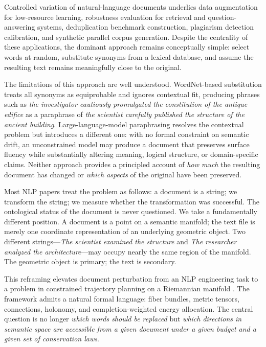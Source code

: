 \documentclass[12pt, a4paper]{article}
\theoremstyle{plain}
\theoremstyle{definition}
\theoremstyle{remark}
\begin{document}
Controlled variation of natural-language documents underlies data augmentation
for low-resource learning, robustness evaluation for retrieval and
question-answering systems, deduplication benchmark construction, plagiarism
detection calibration, and synthetic parallel corpus generation.  Despite the
centrality of these applications, the dominant approach remains conceptually
simple: select words at random, substitute synonyms from a lexical database,
and assume the resulting text remains meaningfully close to the original.

The limitations of this approach are well understood.  WordNet-based substitution
\cite{miller1995wordnet} treats all synonyms as equiprobable and ignores
contextual fit, producing phrases such as \emph{the investigator cautiously
promulgated the constitution of the antique edifice} as a paraphrase of
\emph{the scientist carefully published the structure of the ancient building}.
Large-language-model paraphrasing \cite{brown2020gpt3} resolves the contextual
problem but introduces a different one: with no formal constraint on semantic
drift, an unconstrained model may produce a document that preserves surface
fluency while substantially altering meaning, logical structure, or
domain-specific claims.  Neither approach provides a principled account of
\emph{how much} the resulting document has changed or \emph{which aspects} of
the original have been preserved.

Most NLP papers treat the problem as follows: a document is a string; we
transform the string; we measure whether the transformation was successful.
The ontological status of the document is never questioned.  We take a
fundamentally different position.  A document is a point on a semantic
manifold; the text file is merely one coordinate representation of an underlying
geometric object.  Two different strings---\emph{The scientist examined the
structure} and \emph{The researcher analyzed the architecture}---may occupy
nearly the same region of the manifold.  The geometric object is primary;
the text is secondary.

This reframing elevates document perturbation from an NLP engineering task to a
problem in constrained trajectory planning on a Riemannian manifold
\cite{lee2013smooth, docarmo1992riemannian}.  The framework admits a natural
formal language: fiber bundles, metric tensors, connections, holonomy, and
completion-weighted energy allocation.  The central question is no longer
\emph{which words should be replaced} but \emph{which directions in semantic
space are accessible from a given document under a given budget and a given
set of conservation laws}.
\end{document}
